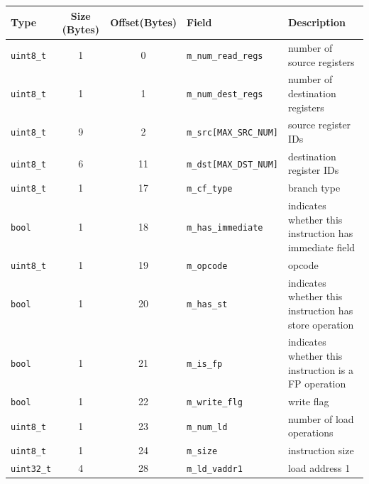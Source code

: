 \vspace{0.2in}
\begin{footnotesize}
\begin{tabular}{l c c l l}
Type            & Size (Bytes) & Offset(Bytes) & Field                     & Description                                            \\ \hline \hline
\Verb+uint8_t+  & 1            & 0             & \Verb+m_num_read_regs+    & number of source registers                             \\
\Verb+uint8_t+  & 1            & 1             & \Verb+m_num_dest_regs+    & number of destination registers                        \\
\Verb+uint8_t+  & 9            & 2             & \Verb+m_src[MAX_SRC_NUM]+ & source register IDs                                    \\
\Verb+uint8_t+  & 6            & 11             & \Verb+m_dst[MAX_DST_NUM]+ & destination register IDs                               \\
\Verb+uint8_t+  & 1            & 17             & \Verb+m_cf_type+          & branch type                                            \\
\Verb+bool+     & 1            & 18             & \Verb+m_has_immediate+    & indicates whether this instruction has immediate field \\
\Verb+uint8_t+  & 1            & 19             & \Verb+m_opcode+           & opcode                                                 \\
\Verb+bool+     & 1            & 20             & \Verb+m_has_st+           & indicates whether this instruction has store operation \\
\Verb+bool+     & 1            & 21             & \Verb+m_is_fp+            & indicates whether this instruction is a FP operation   \\
\Verb+bool+     & 1            & 22             & \Verb+m_write_flg+        & write flag                                             \\
\Verb+uint8_t+  & 1            & 23             & \Verb+m_num_ld+           & number of load operations                              \\
\Verb+uint8_t+  & 1            & 24             & \Verb+m_size+             & instruction size                                       \\
\Verb+uint32_t+ & 4            & 28             & \Verb+m_ld_vaddr1+        & load address 1                                         \\

\end{tabular}
\end{footnotesize}
